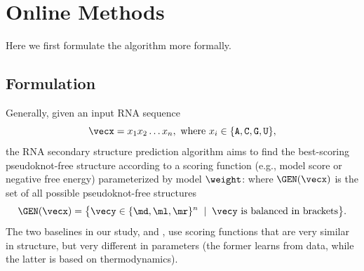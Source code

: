 
\setcounter{figure}{0}
\renewcommand{\thefigure}{Online Method \arabic{figure}}
\setcounter{table}{0}
\renewcommand{\thetable}{Online Method \arabic{table}}

\section*{Online Methods}


Here we first formulate the \linearfold algorithm more formally.

\subsection*{Formulation}
Generally, given an input RNA sequence
$$ \vecx = x_1x_2\ldots x_{n}, \text{ where } x_i \in \{\tt{A},\tt{C},\tt{G},\tt{U}\},$$
the RNA secondary structure prediction algorithm
aims to find the best-scoring pseudoknot-free structure
according to a scoring function \score (e.g., model score or negative free energy) parameterized by model $\weight$:
\vspace{-0.1cm}
where $\GEN(\vecx)$ is the set of all possible pseudoknot-free structures
\[
\GEN(\vecx) =
\big\{\vecy \in \{\md, \ml, \mr\}^n \;\mid\; \vecy \text{~is balanced in brackets}\big\}.
\]
The two baselines in our study, \contrafold
and \viennarnafold, use scoring functions that are very similar  in structure, %
but very different in parameters 
(the former learns \vecw from data, %
while the latter is based on thermodynamics).

